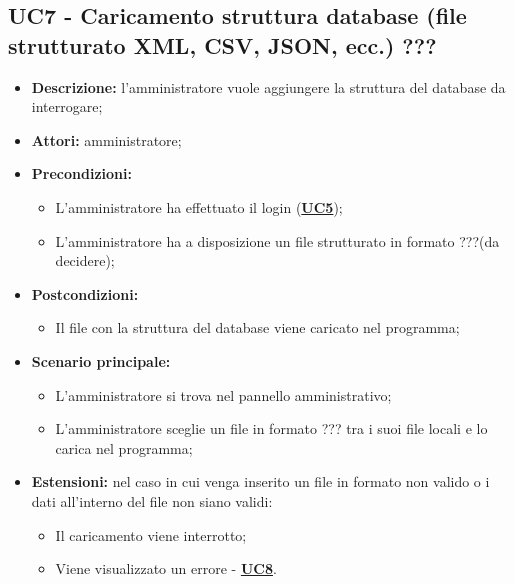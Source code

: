 \documentclass[5pt]{article}
\begin{document}
\subsection{UC7 - Caricamento struttura database (file strutturato XML, CSV, JSON, ecc.) ???}
\label{sec:UC7}
\begin{itemize}
    \item \textbf{Descrizione:} l’amministratore vuole aggiungere la struttura del database da interrogare;
    \item \textbf{Attori:} amministratore;
    \item \textbf{Precondizioni:} 
    \begin{itemize}
        \item L’amministratore ha effettuato il login (\hyperref[sec:UC5]{\textbf{UC5}});
        \item L’amministratore ha a disposizione un file strutturato in formato ???(da decidere);
    \end{itemize}
    \item \textbf{Postcondizioni:} 
    \begin{itemize}
        \item Il file con la struttura del database viene caricato nel programma;
    \end{itemize}
    \item \textbf{Scenario principale:} 
    \begin{itemize}
        \item L’amministratore si trova nel pannello amministrativo;
        \item L’amministratore sceglie un file in formato ??? tra i suoi file locali e lo carica nel programma;
    \end{itemize}
    \item \textbf{Estensioni:} nel caso in cui venga inserito un file in formato non valido o i dati all’interno del file non siano validi:
    \begin{itemize}
        \item Il caricamento viene interrotto;
        \item Viene visualizzato un errore - \hyperref[sec:UC8]{\textbf{UC8}}.
    \end{itemize}
\end{itemize}
\end{document}
